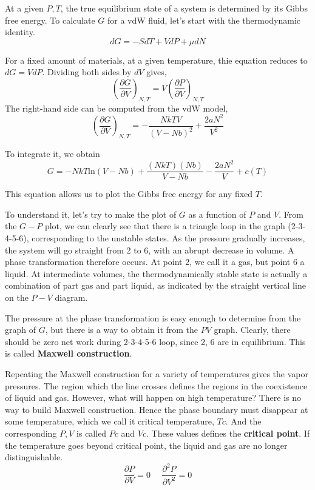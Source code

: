 At a given $P,T$, the true equilibrium state of a system is determined by its Gibbs free energy. To calculate $G$ for a vdW fluid, let's
start with the thermodynamic identity.
\begin{equation}
dG= -SdT + VdP + \mu dN
\end{equation}

For a fixed amount of materials, at a given temperature, thie equation reduces to $dG=VdP$. Dividing both sides by $dV$ gives,
\begin{equation}
(\frac{\partial G}{\partial V})_{N,T} = V (\frac{\partial P}{\partial V})_{N,T} 
\end{equation}
The right-hand side can be computed from the vdW model,
\begin{equation}
(\frac{\partial G}{\partial V})_{N,T} = - \frac{NkTV}{(V-Nb)^2} + \frac{2aN^2}{V^2}
\end{equation}

To integrate it, we obtain
\begin{equation}
G = -NkT\text{ln}(V-Nb) + \frac{(NkT)(Nb)}{V-Nb} - \frac{2aN^2}{V} + c(T)
\end{equation}

This equation allows us to plot the Gibbs free energy for any fixed $T$.

To understand it, let's try to make the plot of $G$ as a function of $P$ and $V$. From the $G-P$ plot, we can clearly see that there is a
triangle loop in the graph (2-3-4-5-6), corresponding to the unstable states. As the pressure gradually increases, the system will go 
straight from 2 to 6, with an abrupt decrease in volume. A phase transformation therefore occurs. At point 2, we call it a gas, but point 6 a liquid.
At intermediate volumes, the thermodynamically stable state is actually a combination of part gas and part liquid, as indicated by the straight
vertical line on the $P-V$ diagram. 

The pressure at the phase transformation is easy enough to determine from the graph of $G$, but there is a way to obtain it from the $PV$ graph.
Clearly, there should be zero net work during 2-3-4-5-6 loop, since 2, 6 are in equilibrium. This is called {\bf Maxwell construction}.

Repeating the Maxwell construction for a variety of temperatures gives the vapor pressures. The region which the line crosses defines the regions in the coexistence of liquid and gas.
However, what will happen on high temperature? There is no way to build Maxwell construction. Hence the phase boundary must disappear at some temperature, which we call it critical temperature, $Tc$.
And the corresponding $P,V$ is called $Pc$ and $Vc$. These values defines the {\bf critical point}. If the temperature goes beyond critical point, the liquid and gas are no longer distinguishable.
\begin{equation}
\frac{\partial P}{\partial V} = 0 ~~~~~~  \frac{\partial^2 P}{\partial V^2} = 0
\end{equation}


